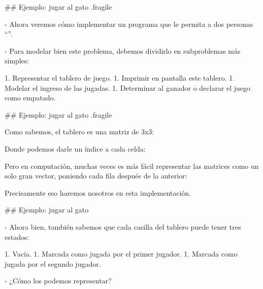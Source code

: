 ## Ejemplo: jugar al gato {.fragile}

- Ahora veremos cómo implementar un programa que le permita a dos personas ``''.
\pause

- Para modelar bien este problema, debemos dividirlo en subproblemas más simples:

\bgnblockgood

1. Representar el tablero de juego.
1. Imprimir en pantalla este tablero.
1. Modelar el ingreso de las jugadas.
1. Determinar al ganador o declarar el juego como empatado.

\trmblockgood

## Ejemplo: jugar al gato {.fragile}


\bgncolumns
{}
Como sabemos, el tablero es una matriz de 3x3:

\bgnblockgood
    \centering
    \tictactoe{}{}{}{}{}{}{}{}{}
\trmblockgood


Donde podemos darle un índice a cada celda:

\bgnblockgood
    \centering
\trmblockgood

\trmcolumns

\pause

\vfill

Pero en computación, muchas veces es más fácil representar las matrices como un solo
gran vector, poniendo cada fila después de la anterior:

\bgnblocknormal[centered,wd=70mm]
    \centering
\trmblocknormal

\vfill

Precisamente eso haremos nosotros en esta implementación.

## Ejemplo: jugar al gato


- Ahora bien, también sabemos que cada casilla del tablero puede tener tres estados:

\bgnblockgood

1. Vacía.
1. Marcada como jugada por el primer jugador.
1. Marcada como jugada por el segundo jugador.

\trmblockgood

- ¿Cómo los podemos representar?

